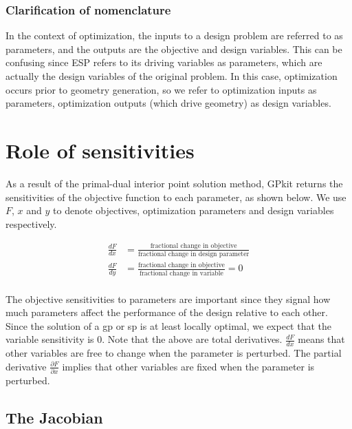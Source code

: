\documentclass[journal]{new-aiaa}
\begin{document}
\subsubsection{Clarification of nomenclature}

In the context of optimization, the inputs to a design problem are referred to as parameters,
and the outputs are the objective and design variables.
This can be confusing since ESP refers to its driving variables as parameters,
which are actually the design variables of the original problem.
In this case, optimization occurs prior to geometry generation,
so we refer to optimization inputs as parameters, optimization outputs (which drive geometry)
as design variables.

\section{Role of sensitivities}

As a result of the primal-dual interior point solution method,
GPkit returns the sensitivities of the objective function to each parameter, as shown below.
We use $F$, $x$ and $y$ to denote objectives, optimization parameters and design variables respectively.

\begin{equation}
\begin{split}
\frac{dF}{dx} &= \frac{\text{fractional change in objective}}{\text{fractional change in design parameter}} \\ 
\frac{dF}{dy} &= \frac{\text{fractional change in objective}}{\text{fractional change in variable}} = 0 \\ 
\end{split}
\end{equation}

The objective sensitivities to parameters are important since they signal
how much parameters affect the performance of the design relative to each other.
Since the solution of a \gls{gp} or \gls{sp} is at least locally optimal,
we expect that the variable sensitivity is 0. Note that the above are total derivatives.
$\frac{dF}{dx}$ means that other variables are free to change when the parameter is perturbed.
The partial derivative $\frac{\partial F}{\partial x}$ implies that other variables are fixed when the parameter is perturbed. 


\subsection{The Jacobian}
\end{document}
